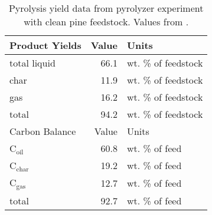 \begin{table}[H]
    \centering
    \caption{Pyrolysis yield data from pyrolyzer experiment with clean pine feedstock. Values from \cite{French-2019}.}
    \label{tab:yields}
    \begin{tabular}{lrl}
        \toprule
        Product Yields & Value & Units \\
        \midrule
        total liquid & 66.1 & wt. \% of feedstock \\
        char & 11.9 & wt. \% of feedstock \\
        gas & 16.2 & wt. \% of feedstock \\
        total & 94.2 & wt. \% of feedstock \\
        \midrule
        Carbon Balance & Value & Units \\
        \midrule
        C$_\textrm{oil}$ & 60.8 & wt. \% of feed \\
        C$_\textrm{char}$ & 19.2 & wt. \% of feed \\
        C$_\textrm{gas}$ & 12.7 & wt. \% of feed \\
        total & 92.7 & wt. \% of feed \\
        \bottomrule
    \end{tabular}
\end{table}

